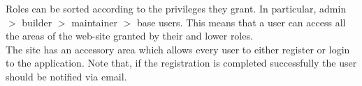 Roles can be sorted according to the privileges they grant. In particular, admin $>$ builder $>$ maintainer $>$ base users. This means that a user can access all the areas of the web-site granted by their and lower roles.\\

The site has an accessory area which allows every user to either register or login to the application.
Note that, if the registration is completed successfully the user should be notified via email.



